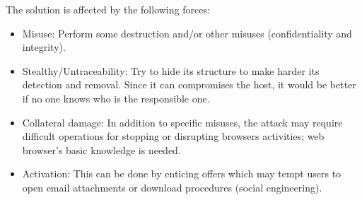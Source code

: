 \documentclass{sig-alternate-05-2015}
\begin{document}
The solution is affected by the following forces:
\begin{itemize}
  \item Misuse: Perform some destruction and/or other misuses (confidentiality and integrity).
  \item Stealthy/Untraceability: Try to hide its structure to make harder its detection and removal. Since it can compromises the host, it would be better if no one knows who is the responsible one. 
  \item Collateral damage: In addition to specific misuses, the attack may require difficult operations for stopping or disrupting browsers activities; web browser's basic knowledge is needed.
  \item Activation: This can be done by enticing offers which may tempt users to open email attachments or download procedures (social engineering).
\end{itemize}
\end{document}
